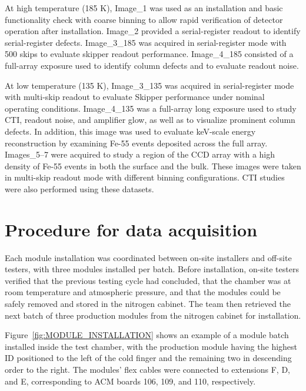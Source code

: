 \documentclass[11pt]{article}
\begin{document}
At high temperature (185 K), Image\_1 was used as an installation and basic functionality check with coarse binning to allow rapid verification of detector operation after installation. Image\_2 provided a serial-register readout to identify serial-register defects. Image\_3\_185 was acquired in serial-register mode with 500 skips to evaluate skipper readout performance. Image\_4\_185 consisted of a full-array exposure used to identify column defects and to evaluate readout noise.

At low temperature (135 K), Image\_3\_135 was acquired in serial-register mode with multi-skip readout to evaluate Skipper performance under nominal operating conditions. Image\_4\_135 was a full-array long exposure used to study CTI, readout noise, and amplifier glow, as well as to visualize prominent column defects. In addition, this image was used to evaluate keV-scale energy reconstruction by examining Fe-55 events deposited across the full array. Images\_5–7 were acquired to study a region of the CCD array with a high density of Fe-55 events in both the surface and the bulk. These images were taken in multi-skip readout mode with different binning configurations. CTI studies were also performed using these datasets.

\newpage

\section{Procedure for data acquisition}
\label{sec:procedure}

Each module installation was coordinated between on-site installers and off-site testers, with three modules installed per batch. Before installation, on-site testers verified that the previous testing cycle had concluded, that the chamber was at room temperature and atmospheric pressure, and that the modules could be safely removed and stored in the nitrogen cabinet. The team then retrieved the next batch of three production modules from the nitrogen cabinet for installation.

Figure~\ref{fig:MODULE_INSTALLATION} shows an example of a module batch installed inside the test chamber, with the production module having the highest ID positioned to the left of the cold finger and the remaining two in descending order to the right. The modules' flex cables were connected to extensions F, D, and E, corresponding to ACM boards 106, 109, and 110, respectively.
\end{document}

